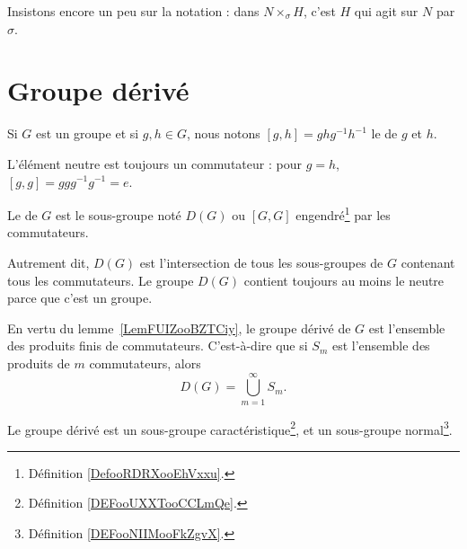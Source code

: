 Insistons encore un peu sur la notation : dans \( N\times_{\sigma}H\), c'est \( H\) qui agit sur \( N\) par \( \sigma\).

\section{Groupe dérivé}

\begin{definition}
    Si \( G\) est un groupe et si \( g,h\in G\), nous notons \( [g,h]=ghg^{-1}h^{-1}\) le  de \( g\) et \( h\). 
\end{definition}

L'élément neutre est toujours un commutateur : pour \( g=h \), \( [g,g]=ggg^{-1}g^{-1}=e \).

\begin{definition}      \label{DEFooBNLPooShKYXa}
    Le  de \( G\) est le sous-groupe noté \( D(G)\) ou \( [G,G]\) engendré\footnote{Définition \ref{DefooRDRXooEhVxxu}.} par les commutateurs.
\end{definition}
Autrement dit, \( D(G)\) est l'intersection de tous les sous-groupes de \( G\) contenant tous les commutateurs. Le groupe \( D(G)\) contient toujours au moins le neutre parce que c'est un groupe.

En vertu du lemme~\ref{LemFUIZooBZTCiy}, le groupe dérivé de \( G\) est l'ensemble des produits finis de commutateurs. C'est-à-dire que si \( S_m\) est l'ensemble des produits de \( m\) commutateurs, alors
\begin{equation}
    D(G)=\bigcup_{m=1}^{\infty}S_m.
\end{equation}

\begin{lemma}   \label{LemMMOCooDJJJhy}
    Le groupe dérivé est un sous-groupe caractéristique\footnote{Définition \ref{DEFooUXXTooCCLmQe}.}, et un sous-groupe normal\footnote{Définition \ref{DEFooNIIMooFkZgvX}.}.
\end{lemma}


